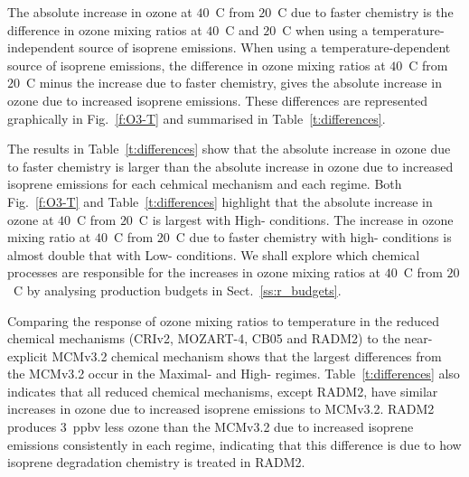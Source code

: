 The absolute increase in ozone at $40$~\degree C from $20$~\degree C due to faster chemistry is the difference in ozone mixing ratios at $40$~\degree C and $20$~\degree C when using a temperature-independent source of isoprene emissions.
When using a temperature-dependent source of isoprene emissions, the difference in ozone mixing ratios at $40$~\degree C from $20$~\degree C minus the increase due to faster chemistry, gives the absolute increase in ozone due to increased isoprene emissions.
These differences are represented graphically in Fig.~\ref{f:O3-T} and summarised in Table~\ref{t:differences}.

The results in Table~\ref{t:differences} show that the absolute increase in ozone due to faster chemistry is larger than the absolute increase in ozone due to increased isoprene emissions for each cehmical mechanism and each  regime.
Both Fig.~\ref{f:O3-T} and Table~\ref{t:differences} highlight that the absolute increase in ozone at $40$~\degree C from $20$~\degree C is largest with High- conditions.
The increase in ozone mixing ratio at $40$~\degree C from $20$~\degree C due to faster chemistry with high- conditions is almost double that with Low- conditions.
We shall explore which chemical processes are responsible for the increases in ozone mixing ratios at $40$~\degree C from $20$~\degree C by analysing  production budgets in Sect.~\ref{ss:r_budgets}.

Comparing the response of ozone mixing ratios to temperature in the reduced chemical mechanisms (CRIv2, MOZART-4, CB05 and RADM2) to the near-explicit MCMv3.2 chemical mechanism shows that the largest differences from the MCMv3.2 occur in the Maximal- and High- regimes.
Table~\ref{t:differences} also indicates that all reduced chemical mechanisms, except RADM2, have similar increases in ozone due to increased isoprene emissions to MCMv3.2.
RADM2 produces $3$~ppbv less ozone than the MCMv3.2 due to increased isoprene emissions consistently in each  regime, indicating that this difference is due to how isoprene degradation chemistry is treated in RADM2.

